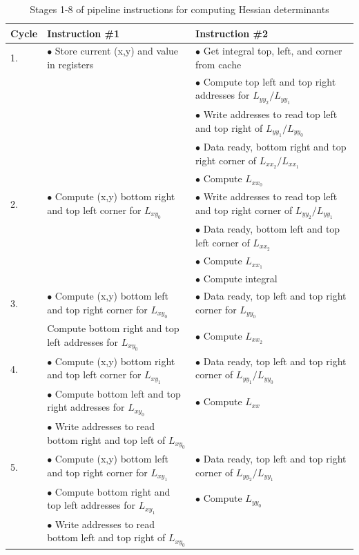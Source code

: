 \documentclass[sigconf]{acmart/acmart}
\begin{document}
\begin{table}[h]
	\centering
	\caption{Stages 1-8 of pipeline instructions for computing Hessian determinants}
	\label{table_pipeline_1}
	\begin{tabulary}{1.0\textwidth}{L|L|L}
		Cycle & Instruction \#1 & Instruction \#2 \\
		\hline
		
		1. & $\bullet$ Store current (x,y) and value in registers & $\bullet$ Get integral top, left, and corner from cache \\
		& & $\bullet$ Compute top left and top right addresses for $L_{yy_2}/L_{yy_1}$ \\
		& & $\bullet$ Write addresses to read top left and top right of $L_{yy_1}/L_{yy_0}$ \\
		& & $\bullet$ Data ready, bottom right and top right corner of $L_{xx_2}/L_{xx_1}$ \\
		& & $\bullet$ Compute $L_{xx_0}$ \\
		\hline
		
		2. & $\bullet$ Compute (x,y) bottom right and top left corner for $L_{xy_0}$ & $\bullet$ Write addresses to read top left and top right corner of $L_{yy_2}/L_{yy_1}$ \\
		& & $\bullet$ Data ready, bottom left and top left corner of $L_{xx_2}$ \\
		& & $\bullet$ Compute $L_{xx_1}$ \\
		& & $\bullet$ Compute integral \\
		\hline
		
		3. & $\bullet$ Compute (x,y) bottom left and top right corner for $L_{xy_0}$ & $\bullet$ Data ready, top left and top right corner for $L_{yy_0}$ \\
		& Compute bottom right and top left addresses for $L_{xy_0}$ & $\bullet$ Compute $L_{xx_2}$ \\
		\hline
		
		4. & $\bullet$ Compute (x,y) bottom right and top left corner for $L_{xy_1}$ & $\bullet$ Data ready, top left and top right corner of $L_{yy_1}/L_{yy_0}$ \\
		& $\bullet$ Compute bottom left and top right addresses for $L_{xy_0}$ & $\bullet$ Compute $L_{xx}$ \\
		& $\bullet$ Write addresses to read bottom right and top left of $L_{xy_0}$ & \\
		\hline
		
		5. & $\bullet$ Compute (x,y) bottom left and top right corner for $L_{xy_1}$ & $\bullet$ Data ready, top left and top right corner of $L_{yy_2}/L_{yy_1}$ \\
		& $\bullet$ Compute bottom right and top left addresses for $L_{xy_1}$ & $\bullet$ Compute $L_{yy_0}$ \\
		& $\bullet$ Write addresses to read bottom left and top right of $L_{xy_0}$ & \\
		\hline
		

\end{tabulary}
\end{table}
\end{document}
